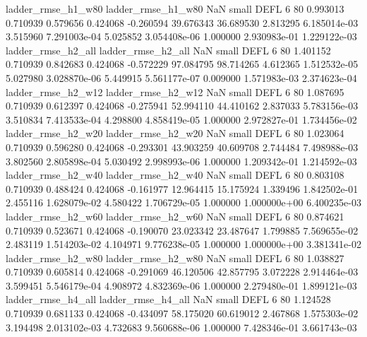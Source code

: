       ladder_rmse_h1_w80       ladder_rmse_h1_w80                   NaN      small     DEFL                 6 80 0.993013       0.710939 0.579656       0.424068   -0.260594     39.676343     36.689530     2.813295   6.185014e-03  3.515960 7.291003e-04     5.025852   3.054408e-06            1.000000    2.930983e-01        1.229122e-03
      ladder_rmse_h2_all       ladder_rmse_h2_all                   NaN      small     DEFL                 6 80 1.401152       0.710939 0.842683       0.424068   -0.572229     97.084795     98.714265     4.612365   1.512532e-05  5.027980 3.028870e-06     5.449915   5.561177e-07            0.009000    1.571983e-03        2.374623e-04
      ladder_rmse_h2_w12       ladder_rmse_h2_w12                   NaN      small     DEFL                 6 80 1.087695       0.710939 0.612397       0.424068   -0.275941     52.994110     44.410162     2.837033   5.783156e-03  3.510834 7.413533e-04     4.298800   4.858419e-05            1.000000    2.972827e-01        1.734456e-02
      ladder_rmse_h2_w20       ladder_rmse_h2_w20                   NaN      small     DEFL                 6 80 1.023064       0.710939 0.596280       0.424068   -0.293301     43.903259     40.609708     2.744484   7.498988e-03  3.802560 2.805898e-04     5.030492   2.998993e-06            1.000000    1.209342e-01        1.214592e-03
      ladder_rmse_h2_w40       ladder_rmse_h2_w40                   NaN      small     DEFL                 6 80 0.803108       0.710939 0.488424       0.424068   -0.161977     12.964415     15.175924     1.339496   1.842502e-01  2.455116 1.628079e-02     4.580422   1.706729e-05            1.000000    1.000000e+00        6.400235e-03
      ladder_rmse_h2_w60       ladder_rmse_h2_w60                   NaN      small     DEFL                 6 80 0.874621       0.710939 0.523671       0.424068   -0.190070     23.023342     23.487647     1.799885   7.569655e-02  2.483119 1.514203e-02     4.104971   9.776238e-05            1.000000    1.000000e+00        3.381341e-02
      ladder_rmse_h2_w80       ladder_rmse_h2_w80                   NaN      small     DEFL                 6 80 1.038827       0.710939 0.605814       0.424068   -0.291069     46.120506     42.857795     3.072228   2.914464e-03  3.599451 5.546179e-04     4.908972   4.832369e-06            1.000000    2.279480e-01        1.899121e-03
      ladder_rmse_h4_all       ladder_rmse_h4_all                   NaN      small     DEFL                 6 80 1.124528       0.710939 0.681133       0.424068   -0.434097     58.175020     60.619012     2.467868   1.575303e-02  3.194498 2.013102e-03     4.732683   9.560688e-06            1.000000    7.428346e-01        3.661743e-03
